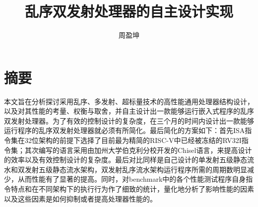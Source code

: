 \confidential{}%
\title{乱序双发射处理器的自主设计实现}%
\author{周盈坤}%
\advisorsec{}%
\maketitle%
\makeenglishtitle%
\makedeclaration%
\chapter*{摘\quad 要}%
\setcounter{page}{1}%
本文旨在分析探讨采用乱序、多发射、超标量技术的高性能通用处理器结构设计，以及对其性能的考量、权衡与取舍，并自主设计出一款能够运行嵌入式程序的乱序双发射处理器。为了有效的控制设计的复杂度，在三个月的时间内设计出一款能够运行程序的乱序双发射处理器就必须有所简化。最后简化的方案如下：首先ISA指令集在32位架构的前提下选择了目前最为精简的RISC-V中已经被冻结的RV32I指令集；其次编写的语言采用由加州大学伯克利分校开发的Chisel语言，来提高设计的效率以及有效控制设计的复杂度。最后对比同样是自己设计的单发射五级静态流水和双发射五级静态流水架构，双发射乱序流水架构运行程序所需的周期数明显减少，从而性能有了显著的提高。同时，对benchmark中的各个性能测试程序自身指令特点和在不同架构下的执行行为作了细致的统计，量化地分析了影响性能的因素以及这些因素是如何抑制或者提高处理器性能的。

